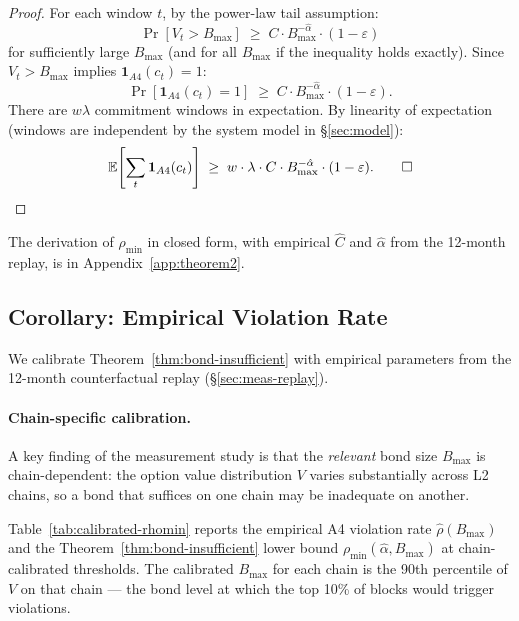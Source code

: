 \begin{proof}
For each window $t$, by the power-law tail assumption:
\[
  \Pr\!\left[V_t > B_{\max}\right] \;\geq\; C \cdot B_{\max}^{-\hat{\alpha}} \cdot (1-\varepsilon)
\]
for sufficiently large $B_{\max}$ (and for all $B_{\max}$ if the inequality
holds exactly). Since $V_t > B_{\max}$ implies $\mathbf{1}_{A4}(c_t) = 1$:
\[
  \Pr[\mathbf{1}_{A4}(c_t) = 1] \;\geq\; C \cdot B_{\max}^{-\hat{\alpha}} \cdot (1-\varepsilon).
\]
There are $w \lambda$ commitment windows in expectation. By linearity of
expectation (windows are independent by the system model in \S\ref{sec:model}):
\[
  \mathbb{E}\!\left[\sum_t \mathbf{1}_{A4}(c_t)\right]
  \;\geq\; w \cdot \lambda \cdot C \cdot B_{\max}^{-\hat{\alpha}} \cdot (1-\varepsilon). \qed
\]
\end{proof}

The derivation of $\rho_{\min}$ in closed form, with empirical $\hat{C}$ and
$\hat{\alpha}$ from the 12-month replay, is in Appendix~\ref{app:theorem2}.


\subsection{Corollary: Empirical Violation Rate}
\label{sec:corollary}

We calibrate Theorem~\ref{thm:bond-insufficient} with empirical parameters
from the 12-month counterfactual replay (\S\ref{sec:meas-replay}).

\paragraph{Chain-specific calibration.}
A key finding of the measurement study is that the \emph{relevant} bond size
$B_{\max}$ is chain-dependent: the option value distribution $V$ varies
substantially across L2 chains, so a bond that suffices on one chain may be
inadequate on another.

Table~\ref{tab:calibrated-rhomin} reports the empirical A4 violation rate
$\hat{\rho}(B_{\max})$ and the Theorem~\ref{thm:bond-insufficient} lower bound
$\rho_{\min}(\hat{\alpha}, B_{\max})$ at chain-calibrated thresholds.
The calibrated $B_{\max}$ for each chain is the 90th percentile of $V$
on that chain --- the bond level at which the top 10\% of blocks would
trigger violations.

